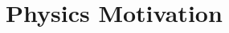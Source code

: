 \documentclass[letterpaper,12pt]{article}  %
\begin{document}
\chapter{Physics Motivation}





\backmatter






%
\end{document}
